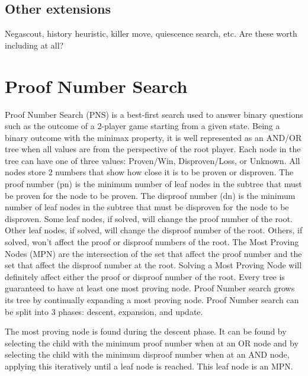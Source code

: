 \subsection{Other extensions}

Negascout, history heuristic, killer move, quiescence search, etc. Are these worth including at all?


\section{Proof Number Search} \label{sec:PNS}

Proof Number Search (PNS) is a best-first search used to answer binary questions such as the outcome of a 2-player game starting from a given state. Being a binary outcome with the minimax property, it is well represented as an AND/OR tree when all values are from the perspective of the root player. Each node in the tree can have one of three values: Proven/Win, Disproven/Loss, or Unknown. All nodes store 2 numbers that show how close it is to be proven or disproven. The proof number (pn) is the minimum number of leaf nodes in the subtree that must be proven for the node to be proven. The disproof number (dn) is the minimum number of leaf nodes in the subtree that must be disproven for the node to be disproven. Some leaf nodes, if solved, will change the proof number of the root. Other leaf nodes, if solved, will change the disproof number of the root. Others, if solved, won't affect the proof or disproof numbers of the root. The Most Proving Nodes (MPN) are the intersection of the set that affect the proof number and the set that affect the disproof number at the root. Solving a Most Proving Node will definitely affect either the proof or disproof number of the root. Every tree is guaranteed to have at least one most proving node. Proof Number search grows its tree by continually expanding a most proving node. Proof Number search can be split into 3 phases: descent, expansion, and update.

The most proving node is found during the descent phase. It can be found by selecting the child with the minimum proof number when at an OR node and by selecting the child with the minimum disproof number when at an AND node, applying this iteratively until a leaf node is reached. This leaf node is an MPN.


